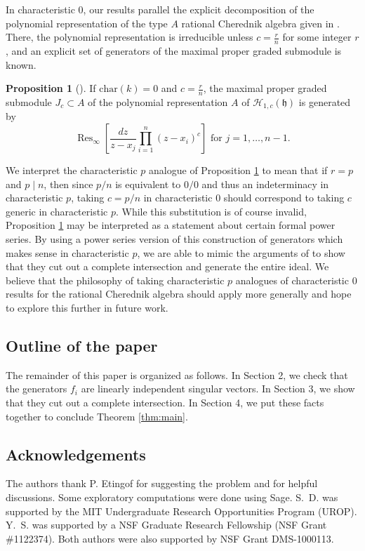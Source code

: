 \documentclass{amsart}
\numberwithin{equation}{section}
\theoremstyle{definition}
\newtheorem{proposition}[theorem]{Proposition}
\newcommand{\Res}{\operatorname{Res}}
\newcommand{\h}{\mathfrak{h}}
\newcommand{\HH}{\mathcal{H}}
\renewcommand{\char}{\text{char}}
\begin{document}
In characteristic $0$, our results parallel the explicit decomposition of the polynomial representation of the type $A$ rational Cherednik algebra given in \cite{BEG, CE}.  There, the polynomial representation is irreducible unless $c = \frac{r}{n}$ for some integer $r$, and an explicit set of generators of the maximal proper graded submodule is known.
\begin{proposition}[{\cite[Proposition 3.1]{CE}}] \label{prop:ce}
If $\char(k) = 0$ and $c = \frac{r}{n}$, the maximal proper graded submodule $J_c \subset A$ of the polynomial representation $A$ of $\HH_{1,c}(\h)$ is generated by
\[
\Res_\infty\left[\frac{dz}{z-x_j} \prod_{i=1}^{n} (z-x_i)^c\right] \text{ for $j=1,\dots,n-1$}.
\]
\end{proposition}
We interpret the characteristic $p$ analogue of Proposition \ref{prop:ce} to mean that if $r = p$ and $p \mid n$, then since $p/n$ is equivalent to $0/0$ and thus an indeterminacy in characteristic $p$, taking $c=p/n$ in characteristic $0$ should correspond to taking $c$ generic in characteristic $p$.  While this substitution is of course invalid, Proposition \ref{prop:ce} may be interpreted as a statement about certain formal power series.  By using a power series version of this construction of generators which makes sense in characteristic $p$, we are able to mimic the arguments of \cite{BEG, CE} to show that they cut out a complete intersection and generate the entire ideal.  We believe that the philosophy of taking characteristic $p$ analogues of characteristic $0$ results for the rational Cherednik algebra should apply more generally and hope to explore this further in future work.

\subsection{Outline of the paper}

The remainder of this paper is organized as follows.  In Section 2, we check that the generators $f_i$ are linearly independent singular vectors.  In Section 3, we show that they cut out a complete intersection.  In Section 4, we put these facts together to conclude Theorem \ref{thm:main}.

\subsection{Acknowledgements} 

The authors thank P. Etingof for suggesting the problem and for helpful discussions.  Some exploratory computations were done using Sage.  S.~D. was supported by the MIT Undergraduate Research Opportunities Program (UROP). Y.~S. was supported by a NSF Graduate Research Fellowship (NSF Grant \#1122374).  Both authors were also supported by NSF Grant DMS-1000113.
\end{document}
